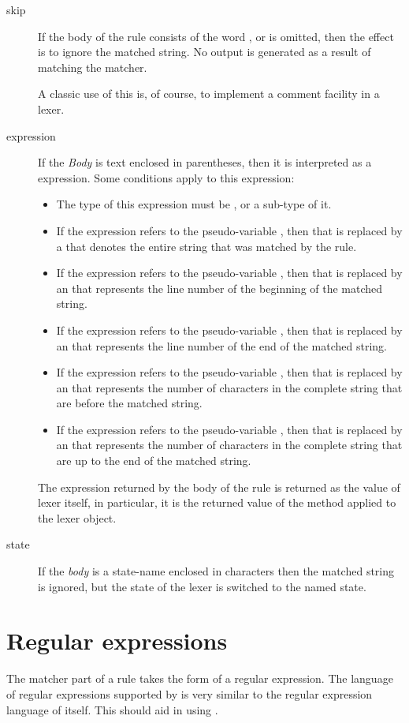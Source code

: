 \begin{description}
\item[skip]
If the body of the rule consists of the word , or is omitted, then the effect is to ignore the matched string. No output is generated as a result of matching the matcher.

A classic use of this is, of course, to implement a comment facility in a lexer.

\item[expression]
If the \emph{Body} is text enclosed in parentheses, then it is interpreted as a \go expression. Some conditions apply to this expression:
\begin{itemize}
\item
The type of this expression must be , or a sub-type of it.
\item
If the expression refers to the pseudo-variable , then that is replaced by a  that denotes the entire string that was matched by the rule.
\item
If the expression refers to the pseudo-variable , then that is replaced by an  that represents the line number of the beginning of the matched string.
\item
If the expression refers to the pseudo-variable , then that is replaced by an  that represents the line number of the end of the matched string.
\item
If the expression refers to the pseudo-variable , then that is replaced by an  that represents the number of characters in the complete string that are before the matched string.
\item
If the expression refers to the pseudo-variable , then that is replaced by an  that represents the number of characters in the complete string that are up to the end of the matched string.
\end{itemize}
The expression returned by the body of the rule is returned as the value of lexer itself, in particular, it is the returned value of the  method applied to the lexer object.

\item[state]
If the \emph{body} is a state-name enclosed in \q{<>} characters then the matched string is ignored, but the state of the lexer is switched to the named state.
\end{description}

\section{Regular expressions}
\label{golex:regexp}
The matcher part of a rule takes the form of a regular expression. The language of regular expressions supported by \golex is very similar to the regular expression language of  itself. This should aid in using \golex.

